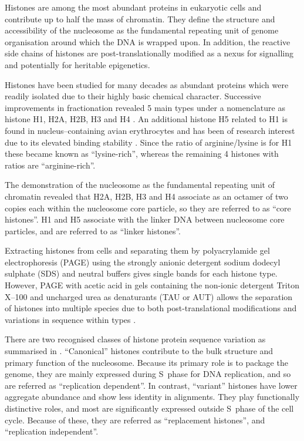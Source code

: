 \documentclass[10pt,a4paper,onecolumn,article]{memoir}
\begin{document}
    Histones are among the most abundant proteins in eukaryotic cells and contribute up
    to half the mass of chromatin. They define the structure and accessibility of the
    nucleosome as the fundamental repeating unit of genome organisation around which
    the DNA is wrapped upon. In addition, the reactive
    side chains of histones are post-translationally modified as a nexus for signalling
    and potentially for heritable epigenetics.

    Histones have been studied for many decades as abundant proteins which were readily
    isolated due to their highly basic chemical character. Successive improvements in
    fractionation revealed 5 main types under a nomenclature as histone H1, H2A, H2B, H3
    and H4 \citep{nomenclature}. An additional histone H5 related to H1 is found in
    nucleus--containing avian erythrocytes and has been of research interest due to its
    elevated binding stability \citep{HFive-review}.
    Since the ratio of arginine/lysine is \LinkerArgLysRatio{}
    for H1 these became known as ``lysine-rich'', whereas the remaining 4 histones with
    ratios \CoreArgLysRatio{} are ``arginine-rich''.

    The demonstration of the nucleosome as the fundamental repeating unit of chromatin revealed
    that H2A, H2B, H3 and H4 associate as an octamer of two copies each within the
    nucleosome core particle, so they are referred to as ``core histones''. H1 and H5
    associate with the linker DNA between nucleosome core particles, and are referred to
    as ``linker histones''.

    Extracting histones from cells and separating them by polyacrylamide gel electrophoresis
    (PAGE) using the strongly anionic detergent sodium dodecyl sulphate (SDS) and neutral
    buffers gives single bands for each histone type. However, PAGE with acetic acid in gels
    containing the non-ionic detergent Triton X--100 and uncharged urea as denaturants
    (TAU or AUT) allows the separation of histones into multiple species due to both
    post-translational modifications and variations in sequence within types \citep{PAGEND}.

    There are two recognised classes of histone protein sequence variation as summarised
    in . ``Canonical'' histones contribute to the
    bulk structure and primary function of the nucleosome. Because its primary role is to
    package the genome, they are mainly expressed during S~phase for DNA replication,
    and so are referred as ``replication dependent''. In contrast, ``variant'' histones
    have lower aggregate abundance and show less identity in alignments. They play
    functionally distinctive roles, and most are significantly expressed outside S~phase
    of the cell cycle. Because of these, they are referred as ``replacement histones'',
    and ``replication independent''.
\end{document}
